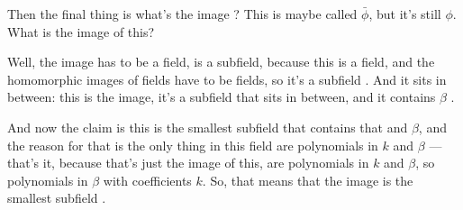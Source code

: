 \begin{proofWrapper}
\begin{content}
\begin{center}
\end{center}
\end{content}

\begin{speech}[01:30:44 - 01:31:46]
Then the final thing is what's the image ? This is maybe called $\bar{\phi}$, but it's still $\phi$. What is the image of this?

Well, the image has to be a field, is a subfield, because this is a field, and the homomorphic images of fields have to be fields, so it's a subfield . And it sits in between: this is the image, it's a subfield that sits in between, and it contains $\beta$ .

And now the claim is this is the smallest subfield that contains that and $\beta$, and the reason for that is the only thing in this field are polynomials in $k$ and $\beta$ --- that's it, because that's just the image of this, are polynomials in $k$ and $\beta$, so polynomials in $\beta$ with coefficients $k$. So, that means that the image is the smallest subfield .
\end{speech}


\end{proofWrapper}
